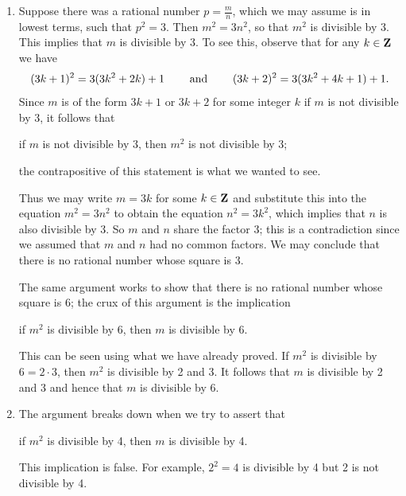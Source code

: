 \documentclass{lew98_solutions}
\begin{document}
\begin{solution}
    \begin{enumerate}
        \item Suppose there was a rational number \( p = \tfrac{m}{n} \), which we may assume is in lowest terms, such that \( p^2 = 3 \). Then \( m^2 = 3 n^2 \), so that \( m^2 \) is divisible by 3. This implies that \( m \) is divisible by 3. To see this, observe that for any \( k \in \mathbf{Z} \) we have
        \[
            (3k + 1)^2 = 3(3k^2 + 2k) + 1 \hspace{8mm} \text{and} \hspace{8mm} (3k + 2)^2 = 3(3k^2 + 4k + 1) + 1.
        \]
        Since \( m \) is of the form \( 3k + 1 \) or \( 3k + 2 \) for some integer \( k \) if \( m \) is not divisible by 3, it follows that
        \begin{center}
            if \( m \) is not divisible by 3, then \( m^2 \) is not divisible by 3;
        \end{center}
        the contrapositive of this statement is what we wanted to see.
        
        Thus we may write \( m = 3k \) for some \( k \in \mathbf{Z} \) and substitute this into the equation \( m^2 = 3 n^2 \) to obtain the equation \( n^2 = 3 k^2 \), which implies that \( n \) is also divisible by 3. So \( m \) and \( n \) share the factor 3; this is a contradiction since we assumed that \( m \) and \( n \) had no common factors. We may conclude that there is no rational number whose square is 3.

        The same argument works to show that there is no rational number whose square is 6; the crux of this argument is the implication
        \begin{center}
            if \( m^2 \) is divisible by 6, then \( m \) is divisible by 6.
        \end{center}
        This can be seen using what we have already proved. If \( m^2 \) is divisible by \( 6 = 2 \cdot 3 \), then \( m^2 \) is divisible by 2 and 3. It follows that \( m \) is divisible by 2 and 3 and hence that \( m \) is divisible by 6.

        \item The argument breaks down when we try to assert that
        \begin{center}
            if \( m^2 \) is divisible by 4, then \( m \) is divisible by 4.
        \end{center}
        This implication is false. For example, \( 2^2 = 4 \) is divisible by 4 but 2 is not divisible by 4.
    \end{enumerate}
\end{solution}
\end{document}
